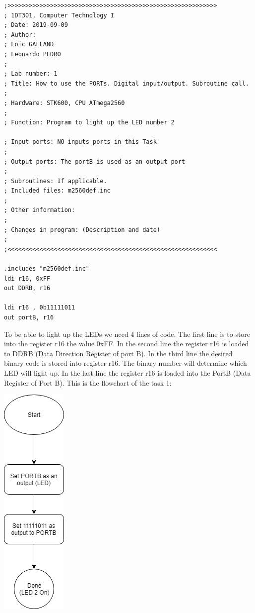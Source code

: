 \documentclass[a4paper,12pt]{article}
\begin{document}
\lstset{style=Asm}
\begin{lstlisting}
;>>>>>>>>>>>>>>>>>>>>>>>>>>>>>>>>>>>>>>>>>>>>>>>>>>>>>>>>>>>
; 1DT301, Computer Technology I
; Date: 2019-09-09
; Author:
; Loic GALLAND
; Leonardo PEDRO
;
; Lab number: 1
; Title: How to use the PORTs. Digital input/output. Subroutine call.
;
; Hardware: STK600, CPU ATmega2560
;
; Function: Program to light up the LED number 2

; Input ports: NO inputs ports in this Task
;
; Output ports: The portB is used as an output port
;
; Subroutines: If applicable.
; Included files: m2560def.inc
;
; Other information:
;
; Changes in program: (Description and date)
;
;<<<<<<<<<<<<<<<<<<<<<<<<<<<<<<<<<<<<<<<<<<<<<<<<<<<<<<<<<<<

.includes "m2560def.inc"
ldi r16, 0xFF
out DDRB, r16

ldi r16 , 0b11111011
out portB, r16
\end{lstlisting}
To be able to light up the LEDs we need 4 lines of code. The first line is to store into the register r16 the value 0xFF. In the second line the register r16 is loaded to DDRB (Data Direction Register of port B). In the third line the desired binary code is stored into register r16. The binary number will determine which LED will light up. In the last line the register r16 is loaded into the PortB (Data Register of Port B).
\newpage
This is the flowchart of the task 1:
\begin{center}
\includegraphics{img/Task1.png}
\end{center}
\end{document}
